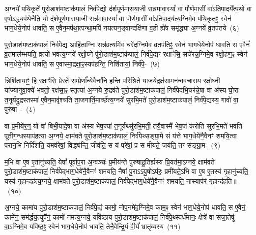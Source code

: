 {\anuvakamend[{प्र॒जाका॑म इन्द्रा॒ग्नी उ॑पप्र॒यात्यै᳚न्द्रा॒ग्नमेका॑\-दश\-कपालं॒ निर्वी॒र्यं॑ पू॒षण॑मे॒वैका॒न्नच॑त्वारि॒ꣳ॒शच्च॑}]}

अ॒ग्नये॑ पथि॒कृते॑ पुरो॒डाश॑\-म॒ष्टा\-क॑पालं॒ निर्व॑पे॒द्यो द॑र्\mbox{}शपूर्णमास\-या॒जी सन्न॑मावा॒स्यां᳚ वा पौर्णमा॒सीं वा॑\-ऽतिपा॒दये᳚त्प॒थो वा ए॒षो\-ऽद्ध्यप॑थेनैति॒ यो द॑र्\mbox{}शपूर्णमासया॒जी सन्न॑मावा॒स्यां᳚ वा पौर्णमा॒सीं वा॑\-ऽतिपा॒दय॑त्य॒ग्निमे॒व प॑थि॒कृत॒ꣴ॒ स्वेन॑ भाग॒धेये॒नोप॑ धावति॒ स ए॒वैन॒मप॑था॒त्पन्था॒मपि॑ नयत्यन॒ड्वान्दक्षि॑णा व॒ही ह्ये॑ष समृ॑द्ध्या अ॒ग्नये᳚ व्र॒तप॑तये~(६)

पुरो॒डाश॑\-म॒ष्टा\-क॑पालं॒ निर्व॑पे॒द्य आहि॑ताग्निः॒ सन्न॑व्र॒त्यमि॑व॒ चरे॑द॒ग्निमे॒व व्र॒तप॑ति॒ꣴ॒ स्वेन॑ भाग॒धेये॒नोप॑ धावति॒ स ए॒वैनं॑ व्र॒तमाल॑म्भयति॒ व्रत्यो॑ भवत्य॒ग्नये॑ रक्षो॒घ्ने पु॑रो॒डाश॑म॒ष्टा\-क॑पालं॒ निर्व॑पे॒द्यꣳ रक्षाꣳ॑सि॒ सचे॑रन्न॒ग्निमे॒व र॑क्षो॒हण॒ꣴ॒ स्वेन॑ भाग॒धेये॒नोप॑ धावति॒ स ए॒वास्मा॒द्रक्षा॒ꣴ॒स्यप॑\-हन्ति॒ निशि॑तायां॒ निर्व॑पे॒-~(७)

न्निशि॑ताया॒ꣳ॒ हि रक्षाꣳ॑सि प्रे॒रते॑ स॒म्प्रेर्णा᳚न्ये॒वैना॑नि हन्ति॒ परि॑श्रिते याजये॒द्रक्ष॑सा॒मन॑न्ववचाराय रक्षो॒घ्नी या᳚ज्यानुवा॒क्ये॑ भवतो॒ रक्ष॑सा॒ꣴ॒ स्तृत्या॑ अ॒ग्नये॑ रु॒द्रव॑ते पुरो॒डाश॑\-म॒ष्टा\-क॑पालं॒ निर्व॑पेदभि॒चर॑न्ने॒षा वा अ॑स्य घो॒रा त॒नूर्यद्रु॒द्रस्तस्मा॑ ए॒वैन॒मावृ॑श्चति ता॒जगार्ति॒मार्च्छ॑त्य॒ग्नये॑ सुरभि॒मते॑ पुरो॒डाश॑\-म॒ष्टा\-क॑पालं॒ निर्व॑पे॒द्यस्य॒ गावो॑ वा॒ पुरु॑षा~-~(८)

वा प्र॒मीये॑र॒न्॒ यो वा॑ बिभी॒यादे॒षा वा अ॑स्य भेष॒ज्या॑ त॒नूर्यथ्सु॑रभि॒मती॒ तयै॒वास्मै॑ भेष॒जं क॑रोति सुरभि॒मते॑ भवति पूतीग॒न्धस्याप॑हत्या अ॒ग्नये॒ क्षाम॑वते पुरो॒डाश॑\-म॒ष्टा\-क॑पालं॒ निर्व॑पेथ्सङ्ग्रा॒मे सं य॑त्ते भाग॒धेये॑नै॒वैनꣳ॑ शमयि॒त्वा परा॑न॒भि निर्दि॑शति॒ यमव॑रेषां॒ विद्ध्य॑न्ति॒ जीव॑ति॒ स यं परे॑षां॒ प्र स मी॑यते॒ जय॑ति॒ तꣳ स॑ङ्ग्रा॒म-~(९)

म॒भि वा ए॒ष ए॒तानु॑च्यति॒ येषां᳚ पूर्वाप॒रा अ॒न्वञ्चः॑ प्र॒मीय॑न्ते पुरुषाहु॒तिर्ह्य॑स्य प्रि॒यत॑मा॒\-ऽग्नये॒ क्षाम॑वते पुरो॒डाश॑\-म॒ष्टा\-क॑पालं॒ निर्व॑पेद्भाग॒धेये॑नै॒वैनꣳ॑ शमयति॒ नैषां᳚ पु॒रा\-ऽऽ\-यु॒षो\-ऽप॑रः॒ प्रमी॑यते॒\-ऽभि वा ए॒ष ए॒तस्य॑ गृ॒हानु॑च्यति॒ यस्य॑ गृ॒हान्दह॑त्य॒ग्नये॒ क्षाम॑वते पुरो॒डाश॑\-म॒ष्टा\-क॑पालं॒ निर्व॑पेद्भाग॒धेये॑नै॒वैनꣳ॑ शमयति॒ नास्याप॑रं गृ॒हान्द॑हति॥~(१०)

{\anuvakamend[{व्र॒तप॑तये॒ निशि॑ताया॒न्निर्व॑पे॒त्पुरु॑षाः सङ्ग्रा॒मन्न च॒त्वारि॑ च}]}%

अ॒ग्नये॒ कामा॑य पुरो॒डाश॑\-म॒ष्टा\-क॑पालं॒ निर्व॑पे॒द्यं कामो॒ नोप॒नमे॑द॒ग्निमे॒व काम॒ꣴ॒ स्वेन॑ भाग॒धेये॒नोप॑ धावति॒ स ए॒वैनं॒ कामे॑न॒ सम॑र्द्धय॒त्युपै॑नं॒ कामो॑ नमत्य॒ग्नये॒ यवि॑ष्ठाय पुरो॒डाश॑\-म॒ष्टा\-क॑पालं॒ निर्व॑पे॒थ्स्पर्ध॑मानः॒ क्षेत्रे॑ वा सजा॒तेषु॑ वा॒\-ऽग्निमे॒व यवि॑ष्ठ॒ꣴ॒ स्वेन॑ भाग॒धेये॒नोप॑ धावति॒ तेनै॒वेन्द्रि॒यं वी॒र्यं॑ भ्रातृ॑व्यस्य~(११)

